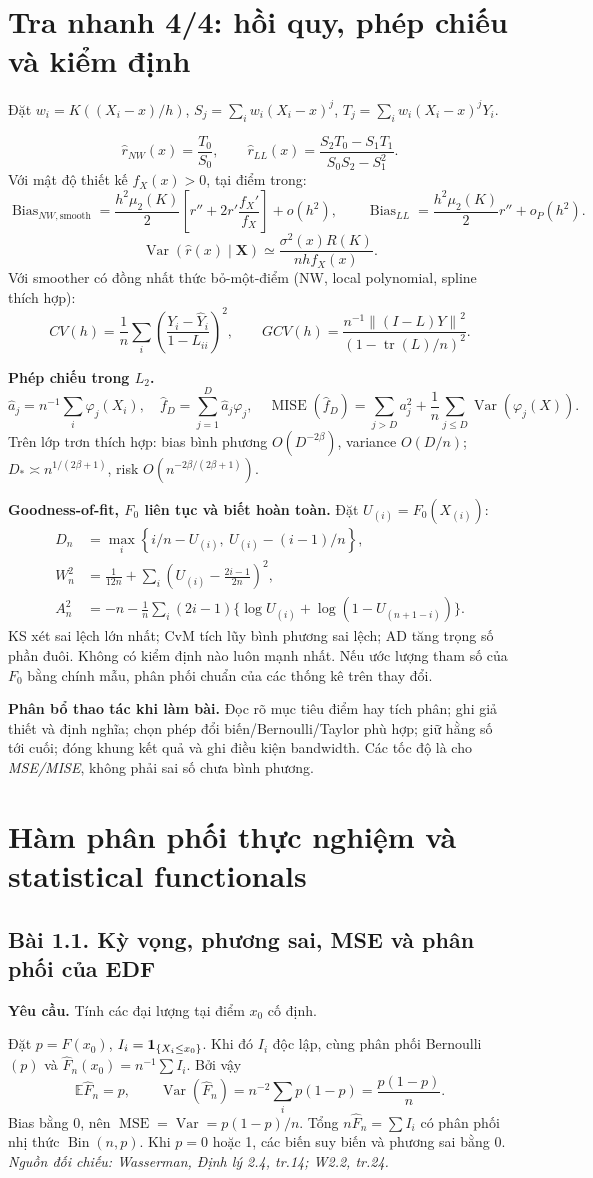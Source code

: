 \documentclass[11pt,a4paper]{article}
\newcommand{\E}{\mathbb E}\newcommand{\Pp}{\mathbb P}
\DeclareMathOperator{\Var}{Var}\DeclareMathOperator{\Cov}{Cov}
\DeclareMathOperator{\Bias}{Bias}\DeclareMathOperator{\MSE}{MSE}
\DeclareMathOperator{\MISE}{MISE}\DeclareMathOperator{\AMISE}{AMISE}
\DeclareMathOperator{\tr}{tr}\DeclareMathOperator{\se}{se}
\newcommand{\Fh}{\widehat F_n}\newcommand{\fh}{\widehat f_h}
\newcommand{\norm}[1]{\left\lVert#1\right\rVert}
\newcommand{\src}[1]{\textit{Nguồn đối chiếu: #1.}}
\newcommand{\prob}[3]{\subsection{Bài #1. #2}\label{b:#1}\textbf{Yêu cầu.} #3\par}
\begin{document}
\section*{Tra nhanh 4/4: hồi quy, phép chiếu và kiểm định}
Đặt $w_i=K((X_i-x)/h)$, $S_j=\sum_iw_i(X_i-x)^j$, $T_j=\sum_iw_i(X_i-x)^jY_i$.
\begin{result}
\[
\widehat r_{NW}(x)=\frac{T_0}{S_0},\qquad
\widehat r_{LL}(x)=\frac{S_2T_0-S_1T_1}{S_0S_2-S_1^2}.
\]
Với mật độ thiết kế $f_X(x)>0$, tại điểm trong:
\[
\Bias_{NW,\mathrm{smooth}}=\frac{h^2\mu_2(K)}2\left[r''+2r'\frac{f_X'}{f_X}\right]+o(h^2),
\qquad
\Bias_{LL}=\frac{h^2\mu_2(K)}2r''+o_P(h^2).
\]
\[
\Var(\widehat r(x)\mid\mathbf X)\simeq\frac{\sigma^2(x)R(K)}{nh f_X(x)}.
\]
Với smoother có đồng nhất thức bỏ-một-điểm (NW, local polynomial, spline thích hợp):
\[
CV(h)=\frac1n\sum_i\left(\frac{Y_i-\widehat Y_i}{1-L_{ii}}\right)^2,
\qquad GCV(h)=\frac{n^{-1}\norm{(I-L)Y}^2}{(1-\tr(L)/n)^2}.
\]
\end{result}
\textbf{Phép chiếu trong $L_2$.}
\[
\widehat a_j=n^{-1}\sum_i\varphi_j(X_i),\quad
\widehat f_D=\sum_{j=1}^D\widehat a_j\varphi_j,\quad
\MISE(\widehat f_D)=\sum_{j>D}a_j^2+\frac1n\sum_{j\le D}\Var(\varphi_j(X)).
\]
Trên lớp trơn thích hợp: bias bình phương $O(D^{-2\beta})$, variance $O(D/n)$;
$D_*\asymp n^{1/(2\beta+1)}$, risk $O(n^{-2\beta/(2\beta+1)})$.

\textbf{Goodness-of-fit, $F_0$ liên tục và biết hoàn toàn.} Đặt $U_{(i)}=F_0(X_{(i)})$:
\begin{align*}
D_n&=\max_i\left\{i/n-U_{(i)},\ U_{(i)}-(i-1)/n\right\},\\
W_n^2&=\frac1{12n}+\sum_i\left(U_{(i)}-\frac{2i-1}{2n}\right)^2,\\
A_n^2&=-n-\frac1n\sum_i(2i-1)\{\log U_{(i)}+\log(1-U_{(n+1-i)})\}.
\end{align*}
KS xét sai lệch lớn nhất; CvM tích lũy bình phương sai lệch; AD tăng trọng số phần đuôi. Không có kiểm định nào luôn mạnh nhất. Nếu ước lượng tham số của $F_0$ bằng chính mẫu, phân phối chuẩn của các thống kê trên thay đổi.

\textbf{Phân bổ thao tác khi làm bài.} Đọc rõ mục tiêu điểm hay tích phân; ghi giả thiết và định nghĩa; chọn phép đổi biến/Bernoulli/Taylor phù hợp; giữ hằng số tới cuối; đóng khung kết quả và ghi điều kiện bandwidth. Các tốc độ là cho \emph{MSE/MISE}, không phải sai số chưa bình phương.
\clearpage
\tableofcontents
\clearpage
\section{Hàm phân phối thực nghiệm và statistical functionals}
\prob{1.1}{Kỳ vọng, phương sai, MSE và phân phối của EDF}{Tính các đại lượng tại điểm $x_0$ cố định.}
Đặt $p=F(x_0)$, $I_i=\mathbf 1_{\{X_i\le x_0\}}$. Khi đó $I_i$ độc lập, cùng phân phối Bernoulli$(p)$ và $\Fh(x_0)=n^{-1}\sum I_i$. Bởi vậy
\[
\E\Fh=p,\qquad \Var(\Fh)=n^{-2}\sum_i p(1-p)=\frac{p(1-p)}n.
\]
Bias bằng 0, nên $\MSE=\Var=p(1-p)/n$. Tổng $n\Fh=\sum I_i$ có phân phối nhị thức $\operatorname{Bin}(n,p)$. Khi $p=0$ hoặc 1, các biến suy biến và phương sai bằng 0.
\src{Wasserman, Định lý 2.4, tr.14; W2.2, tr.24}
\end{document}
